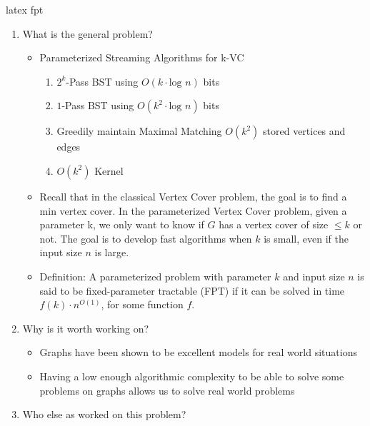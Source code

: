 \gls{latex}
\acrshort{fpt}

\begin{enumerate}
    \item What is the general problem?
    \begin{itemize}
        \item Parameterized Streaming Algorithms for k-VC
        \begin{enumerate}
            \item $2^k$-Pass BST using $O(k \cdot \text{log } n)$ bits
            \item $1$-Pass BST using $O(k^2 \cdot \text{log } n)$ bits
            \item Greedily maintain Maximal Matching $O(k^2)$ stored vertices and edges
            \item $O(k^2)$ Kernel
        \end{enumerate}
        \item {}Recall that in the classical Vertex Cover problem, the goal is to find a min vertex cover. In the parameterized Vertex Cover problem, given a parameter k, we only want to know if $G$ has a vertex cover of size $\leq k$ or not. The goal is to develop fast algorithms when $k$ is small, even if the input size $n$ is large.
        \item Definition: A parameterized problem with parameter $k$ and input size $n$ is said to be fixed-parameter tractable (FPT) if it can be solved in time $f(k) \cdot n^{O(1)}$, for some function $f$.
    \end{itemize}
    \item Why is it worth working on?
    \begin{itemize}
        \item Graphs have been shown to be excellent models for real world situations
        \item Having a low enough algorithmic complexity to be able to solve some problems on graphs allows us to solve real world problems
    \end{itemize}
    \item Who else as worked on this problem?

\end{enumerate}
